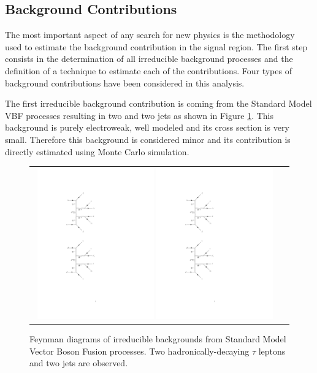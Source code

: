 \subsection{Background Contributions}
\label{sec::bg_contributions}

The most important aspect of any search for new physics is the methodology used to estimate the background contribution in the signal region. The first step consists in the determination of all irreducible background processes and the definition of a technique to estimate each of the contributions. Four types of background contributions have been considered in this analysis. 

The first irreducible background contribution is coming from the Standard Model VBF processes resulting in two \hadtau and two jets as shown in Figure \ref{fig:background_SMVBF}. This background is purely electroweak, well modeled and its cross section is very small. Therefore this background is considered minor and its contribution is directly estimated using Monte Carlo simulation.

\begin{figure}[tbh!]
	\centering
	\begin{tabular}{cc}
		\includegraphics[width=0.48\textwidth]{diagrams/pics/background_SMVBFminus.pdf}
		\includegraphics[width=0.48\textwidth]{diagrams/pics/background_SMVBFplus.pdf} 		
	\end{tabular}
	\caption{Feynman diagrams of irreducible backgrounds from Standard Model Vector Boson Fusion processes. Two hadronically-decaying $\tau$ leptons and two jets are observed. }
	\label{fig:background_SMVBF}
\end{figure}

